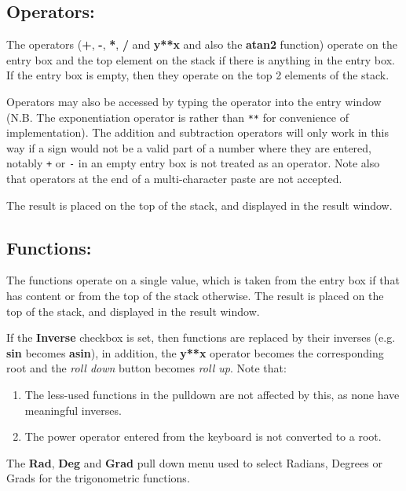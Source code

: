\documentclass{article}
\begin{document}
  \subsection{Operators:}

  The operators (\textbf{+}, \textbf{-}, \textbf{*}, \textbf{/} and
  \textbf{y**x} and also the \textbf{atan2} function) operate on the entry
  box and the top element on the stack if there is anything in the
  entry box. If the entry box is empty, then they operate on the top 2
  elements of the stack.

  Operators may also be accessed by typing the operator into the entry
  window (N.B. The exponentiation operator is \texttt{\Circum} rather than
  \texttt{**} for convenience of implementation). The addition and
  subtraction operators will only work in this way if a sign would not
  be a valid part of a number where they are entered, notably
  \texttt{+} or \texttt{-} in an empty entry box is not treated as an
  operator. Note also that operators at the end of a multi-character
  paste are not accepted.

  The result is placed on the top of the stack, and displayed in the
  result window.

  \subsection{Functions:}

  The functions operate on a single value, which is taken from the
  entry box if that has content or from the top of the stack
  otherwise. The result is placed on the top of the stack, and
  displayed in the result window.

  If the \textbf{Inverse} checkbox is set, then functions are replaced
  by their inverses (e.g. \textbf{sin} becomes \textbf{asin}), in
  addition, the \textbf{y**x} operator becomes the
  corresponding root and the
  \emph{roll down} button becomes \emph{roll up}. Note that:
  \begin{enumerate}
  \item The less-used functions in the pulldown are not affected by
    this, as none have meaningful inverses.
  \item The power operator \textbf{\Circum} entered from the keyboard is not
    converted to a root.
  \end{enumerate}

  The \textbf{Rad}, \textbf{Deg} and \textbf{Grad} pull down menu
  used to select Radians, Degrees or Grads for the trigonometric
  functions.
\end{document}

